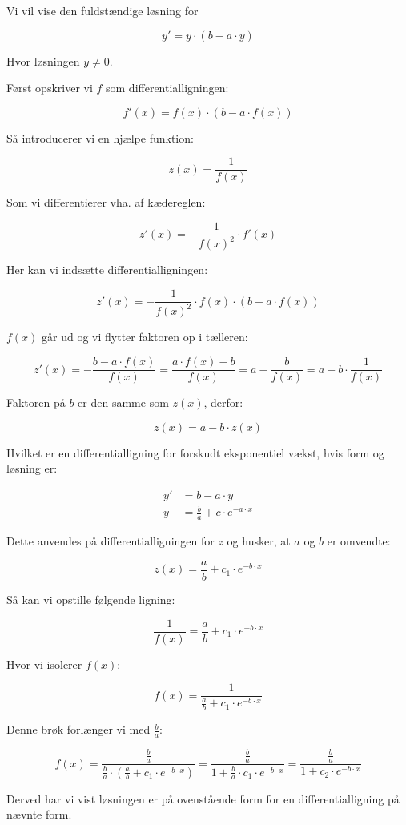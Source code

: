 \documentclass{article}
\makeatletter
\newenvironment{proofw}{\par
  \pushQED{\qed}%
  \normalfont \topsep6\p@\@plus6\p@\relax
  \trivlist
  \item[]\ignorespaces
}{%
  \popQED\endtrivlist\@endpefalse
}
\makeatother
\begin{document}
\begin{proofw}
    
Vi vil vise den fuldstændige løsning for

$$
    y'=y \cdot (b-a\cdot y)
$$

Hvor løsningen $y \neq 0$.

Først opskriver vi $f$ som differentialligningen:

$$
    f'(x)=f(x) \cdot (b-a \cdot f(x))
$$

Så introducerer vi en hjælpe funktion:

$$
    z(x)=\frac{1}{f(x)}
$$

Som vi differentierer vha. af kædereglen:

$$
    z'(x)=-\frac{1}{f(x)^2} \cdot f'(x)
$$

Her kan vi indsætte differentialligningen:

$$
    z'(x)=-\frac{1}{f(x)^2} \cdot f(x) \cdot (b-a \cdot f(x))
$$

$f(x)$ går ud og vi flytter faktoren op i tælleren:

$$
    z'(x)=-\frac{b-a \cdot f(x)}{f(x)}=\frac{a \cdot f(x)-b}{f(x)}=a-\frac{b}{f(x)}
    =a-b\cdot \frac{1}{f(x)}
$$

Faktoren på $b$ er den samme som $z(x)$, derfor:

$$
    z(x)=a-b\cdot z(x)
$$

Hvilket er en differentialligning for forskudt eksponentiel vækst,
hvis form og løsning er:

\begin{align*}
    y'&=b-a\cdot y
    \\
    y&=\frac{b}{a}+c \cdot e^{-a\cdot x}
\end{align*}

Dette anvendes på differentialligningen for $z$ og husker, at $a$ og $b$ er omvendte:

$$
    z(x)=\frac{a}{b}+c_1 \cdot e^{-b\cdot x}
$$

Så kan vi opstille følgende ligning:

$$
    \frac{1}{f(x)}=\frac{a}{b}+c_1 \cdot e^{-b\cdot x}
$$

Hvor vi isolerer $f(x)$:

$$
    f(x)=\frac{1}{\frac{a}{b}+c_1 \cdot e^{-b\cdot x}}
$$

Denne brøk forlænger vi med $\frac{b}{a}$:

$$
    f(x)=\frac{\frac{b}{a}}{\frac{b}{a} \cdot (\frac{a}{b}+c_1 \cdot e^{-b\cdot x})}
    =\frac{\frac{b}{a}}{
        1+\frac{b}{a}\cdot c_1 \cdot e^{-b \cdot x}
    }
    =
    \frac{\frac{b}{a}}{
        1+c_2 \cdot e^{-b \cdot x}
    }
$$

Derved har vi vist løsningen er på ovenstående form for
en differentialligning på nævnte form.

\end{proofw}
\end{document}
